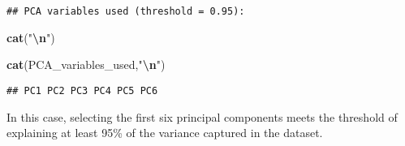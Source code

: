 \documentclass[
]{article}
\newenvironment{Shaded}{\begin{snugshade}}{\end{snugshade}}
\newcommand{\AttributeTok}[1]{\textcolor[rgb]{0.13,0.29,0.53}{#1}}
\newcommand{\DecValTok}[1]{\textcolor[rgb]{0.00,0.00,0.81}{#1}}
\newcommand{\FloatTok}[1]{\textcolor[rgb]{0.00,0.00,0.81}{#1}}
\newcommand{\FunctionTok}[1]{\textcolor[rgb]{0.13,0.29,0.53}{\textbf{#1}}}
\newcommand{\NormalTok}[1]{#1}
\newcommand{\OtherTok}[1]{\textcolor[rgb]{0.56,0.35,0.01}{#1}}
\newcommand{\SpecialCharTok}[1]{\textcolor[rgb]{0.81,0.36,0.00}{\textbf{#1}}}
\newcommand{\StringTok}[1]{\textcolor[rgb]{0.31,0.60,0.02}{#1}}
\begin{document}
\begin{Shaded}
\end{Shaded}

\begin{verbatim}
## PCA variables used (threshold = 0.95):
\end{verbatim}

\begin{Shaded}
\begin{Highlighting}[]
\FunctionTok{cat}\NormalTok{(}\StringTok{"}\SpecialCharTok{\textbackslash{}n}\StringTok{"}\NormalTok{)}
\end{Highlighting}
\end{Shaded}

\begin{Shaded}
\begin{Highlighting}[]
\FunctionTok{cat}\NormalTok{(PCA\_variables\_used,}\StringTok{"}\SpecialCharTok{\textbackslash{}n}\StringTok{"}\NormalTok{)}
\end{Highlighting}
\end{Shaded}

\begin{verbatim}
## PC1 PC2 PC3 PC4 PC5 PC6
\end{verbatim}

In this case, selecting the first six principal components meets the
threshold of explaining at least 95\% of the variance captured in the
dataset.
\end{document}
